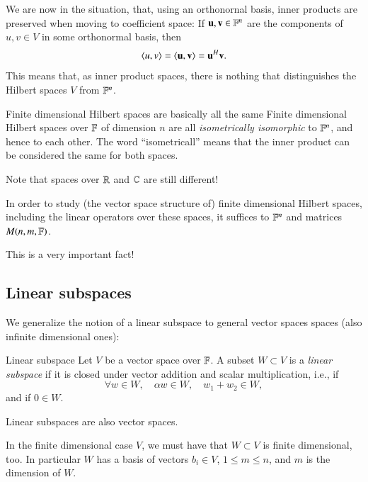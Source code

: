 We are now in the situation, that, using an orthonornal basis, inner products are preserved when moving to coefficient space: If $\mathbf{u},\mathbf{v}\in\mathbb{F}^n$ are the components of $u,v\in V$ in some orthonormal basis, then
\begin{equation}
    \braket{u,v} = \braket{\mathbf{u},\mathbf{v}} = \mathbf{u}^H \mathbf{v}.
\end{equation}
This means that, as inner product spaces, there is nothing that distinguishes the Hilbert spaces $V$ from $\mathbb{F}^n$.

\begin{myTheorem}{Finite dimensional Hilbert spaces are basically all the same}{}
Finite dimensional Hilbert spaces over $\mathbb{F}$ of dimension $n$ are all \emph{isometrically isomorphic} to $\mathbb{F}^n$, and hence to each other. The word ``isometricall'' means that the inner product can be considered the same for both spaces.

Note that spaces over $\mathbb{R}$ and $\mathbb{C}$ are still different!
\end{myTheorem}

\begin{myRemark}{}{}
In order to study (the vector space structure of) finite dimensional Hilbert spaces, including the linear operators over these spaces, it suffices to $\mathbb{F}^n$ and matrices $M(n,m,\mathbb{F})$.

This is a very important fact!
\end{myRemark}

\subsection{Linear subspaces}

We generalize the notion of a linear subspace to general vector spaces spaces (also infinite dimensional ones):
\begin{myDefinition}{Linear subspace}{}
Let $V$ be a vector space over $\mathbb{F}$. A subset $W \subset V$ is a \emph{linear subspace} if it is closed under vector addition and scalar multiplication, i.e., if
\begin{equation}
    \forall w \in W, \quad \alpha w \in W, \quad w_1 + w_2 \in W,
\end{equation}
and if $0 \in W$.
\end{myDefinition}



Linear subspaces are also vector spaces.

In the finite dimensional case $V$, we must have that $W\subset V$ is finite dimensional, too. In particular $W$ has a basis of vectors $b_i \in V$, $1 \leq m \leq n$, and $m$ is the dimension of $W$.

